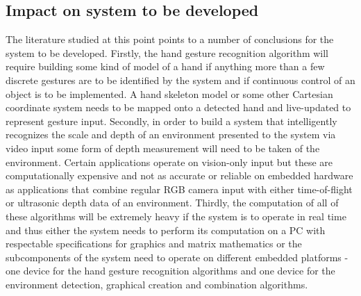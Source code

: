 \subsection{Impact on system to be developed}

The literature studied at this point points to a number of conclusions for the system to be developed. Firstly, the hand gesture recognition algorithm will require building some kind of model of a hand if anything more than a few discrete gestures are to be identified by the system and if continuous control of an object is to be implemented. A hand skeleton model or some other Cartesian coordinate system needs to be mapped onto a detected hand and live-updated to represent gesture input. Secondly, in order to build a system that intelligently recognizes the scale and depth of an environment presented to the system via video input some form of depth measurement will need to be taken of the environment. Certain applications operate on vision-only input but these are computationally expensive and not as accurate or reliable on embedded hardware as applications that combine regular RGB camera input with either time-of-flight or ultrasonic depth data of an environment. Thirdly, the computation of all of these algorithms will be extremely heavy if the system is to operate in real time and thus either the system needs to perform its computation on a PC with respectable specifications for graphics and matrix mathematics or the subcomponents of the system need to operate on different embedded platforms - one device for the hand gesture recognition algorithms and one device for the environment detection, graphical creation and combination algorithms. 